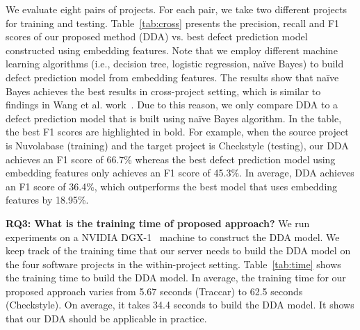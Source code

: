 We evaluate eight pairs of projects. For each pair, we take two different projects for training and testing. Table~\ref{tab:cross} presents the precision, recall and F1 scores of our proposed method (DDA) vs. best defect prediction model constructed using embedding features. Note that we employ different machine learning algorithms (i.e., decision tree, logistic regression, na\"{i}ve Bayes) to build defect prediction model from embedding features. The results show that na\"{i}ve Bayes achieves the best results in cross-project setting, which is similar to findings in Wang et al. work~\cite{wang2016automatically}. Due to this reason, we only compare DDA to a defect prediction model that is built using na\"{i}ve Bayes algorithm.
In the table, the best F1 scores are highlighted in bold. For example, when the source project is Nuvolabase (training) and the target project is Checkstyle (testing), our DDA achieves an F1 score of 66.7\% whereas the best defect prediction model using embedding features only achieves an F1 score of 45.3\%. In average, DDA achieves an F1 score of 36.4\%, which outperforms the best model that uses embedding features by 18.95\%. 

\textbf{RQ3: What is the training time of proposed approach?}
We run experiments on a NVIDIA DGX-1~\cite{nvidia} machine to construct the DDA model. 
We keep track of the training time that our server needs to build the DDA model on the four software projects in the within-project setting. 
Table~\ref{tab:time} shows the training time to build the DDA model. In average, the training time for our proposed approach varies from 5.67 seconds (Traccar) to 62.5 seconds (Checkstyle). On average, it takes 34.4 seconds to build the DDA model. It shows that our DDA should be applicable in practice.



